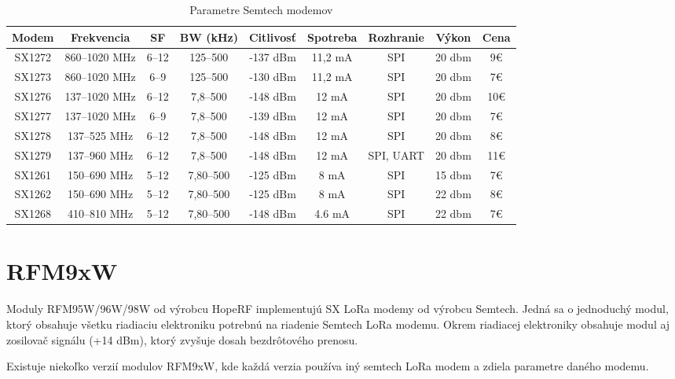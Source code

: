 \documentclass[slovak,master]{diploma}
\begin{document}
\begin{table}[!h]
	\centering
  \small
  \setlength\tabcolsep{6pt}
	\caption[Parametre Semtech modemov]{Parametre Semtech modemov}
  \begin{tabular}{c|c|c|c|c|c|c|c|c}
    \toprule
    Modem & Frekvencia & SF & BW (kHz) & Citlivosť & Spotreba \footnotemark[0] & Rozhranie & Výkon\footnotemark[1] & Cena\footnotemark[2]\\
    \midrule
    SX1272 & 860--1020 MHz & 6--12 & 125--500 & -137 dBm & 11,2 mA & SPI & 20 dbm & 9€ \\
    SX1273 & 860--1020 MHz & 6--9 & 125--500 & -130 dBm & 11,2 mA & SPI & 20 dbm & 7€ \\
    SX1276 & 137--1020 MHz & 6--12 & 7,8--500 & -148 dBm & 12 mA & SPI & 20 dbm & 10€ \\
    SX1277 & 137--1020 MHz & 6--9 & 7,8--500 & -139 dBm & 12 mA & SPI & 20 dbm & 7€ \\
    SX1278 & 137--525 MHz & 6--12 & 7,8--500 & -148 dBm & 12 mA & SPI & 20 dbm & 8€ \\
    SX1279 & 137--960 MHz & 6--12 & 7,8--500 & -148 dBm & 12 mA & SPI, UART & 20 dbm & 11€ \\
    \hline
    SX1261 & 150--690 MHz & 5--12 & 7,80--500 & -125 dBm & 8 mA & SPI & 15 dbm & 7€ \\
    SX1262 & 150--690 MHz & 5--12 & 7,80--500 & -125 dBm & 8 mA & SPI & 22 dbm & 8€ \\
    SX1268 & 410--810 MHz & 5--12 & 7,80--500 & -148 dBm & 4.6 mA & SPI & 22 dbm & 7€ \\
    \midrule
  \end{tabular}
\end{table}

\section{RFM9xW}
Moduly RFM95W/96W/98W od výrobcu HopeRF \cite{hoperf} implementujú SX LoRa modemy od výrobcu Semtech.
Jedná sa o jednoduchý modul, ktorý obsahuje všetku riadiaciu elektroniku potrebnú na riadenie Semtech LoRa modemu.
Okrem riadiacej elektroniky obsahuje modul aj zosilovač signálu (+14 dBm), ktorý zvyšuje dosah bezdrôtového prenosu.

Existuje niekoľko verzií modulov RFM9xW, kde každá verzia používa iný semtech LoRa modem a zdiela parametre daného modemu.
\end{document}
